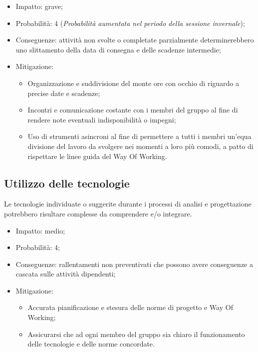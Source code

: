 \documentclass[a4paper, twoside]{article}
\begin{document}
\begin{itemize}
    \item Impatto: grave;

    \item Probabilità: 4 (\textit{Probabilità aumentata nel periodo della sessione invernale});

    \item Conseguenze: attività non svolte o completate parzialmente determinerebbero uno slittamento della data di consegna e delle scadenze intermedie;
    \item Mitigazione:
        \begin{itemize}
            \item Organizzazione e suddivisione del monte ore con occhio di riguardo a precise date e scadenze;
            \item Incontri e comunicazione costante con i membri del gruppo al fine di rendere note eventuali indisponibilità o impegni;
            \item Uso di strumenti asincroni al fine di permettere a tutti i membri un'equa divisione del lavoro da svolgere nei momenti a loro più comodi, a patto di rispettare le linee guida del Way Of Working.
        \end{itemize}
\end{itemize}


\subsection{Utilizzo delle tecnologie}

Le tecnologie individuate o suggerite durante i processi di analisi e progettazione potrebbero risultare complesse da comprendere e/o integrare.

\begin{itemize}
    \item Impatto: medio;

    \item Probabilità: 4;

    \item Conseguenze: rallentamenti non preventivati che possono avere conseguenze a cascata sulle attività dipendenti;
    \item Mitigazione:
        \begin{itemize}
            \item Accurata pianificazione e stesura delle norme di progetto e Way Of Working;
            \item Assicurarsi che ad ogni membro del gruppo sia chiaro il funzionamento delle tecnologie e delle norme concordate.
        \end{itemize}
\end{itemize}
\end{document}
